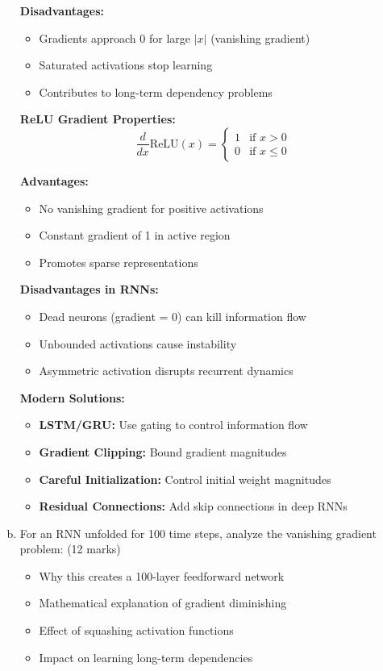 \documentclass[12pt]{article}
\begin{document}
\begin{enumerate}[(a)]
{    \textbf{Disadvantages:}
    \begin{itemize}
        \item Gradients approach 0 for large $|x|$ (vanishing gradient)
        \item Saturated activations stop learning
        \item Contributes to long-term dependency problems
    \end{itemize}
    
    \textbf{ReLU Gradient Properties:}
    $$\frac{d}{dx}\text{ReLU}(x) = \begin{cases} 1 & \text{if } x > 0 \\ 0 & \text{if } x \leq 0 \end{cases}$$
    
    \textbf{Advantages:}
    \begin{itemize}
        \item No vanishing gradient for positive activations
        \item Constant gradient of 1 in active region
        \item Promotes sparse representations
    \end{itemize}
    
    \textbf{Disadvantages in RNNs:}
    \begin{itemize}
        \item Dead neurons (gradient = 0) can kill information flow
        \item Unbounded activations cause instability
        \item Asymmetric activation disrupts recurrent dynamics
    \end{itemize}
    
    \textbf{Modern Solutions:}
    \begin{itemize}
        \item \textbf{LSTM/GRU:} Use gating to control information flow
        \item \textbf{Gradient Clipping:} Bound gradient magnitudes
        \item \textbf{Careful Initialization:} Control initial weight magnitudes
        \item \textbf{Residual Connections:} Add skip connections in deep RNNs
    \end{itemize}
    }
    
    \item For an RNN unfolded for 100 time steps, analyze the vanishing gradient problem: \hfill (12 marks)
    \begin{itemize}
        \item Why this creates a 100-layer feedforward network
        \item Mathematical explanation of gradient diminishing
        \item Effect of squashing activation functions
        \item Impact on learning long-term dependencies
    \end{itemize}
    

\end{enumerate}
\end{document}
